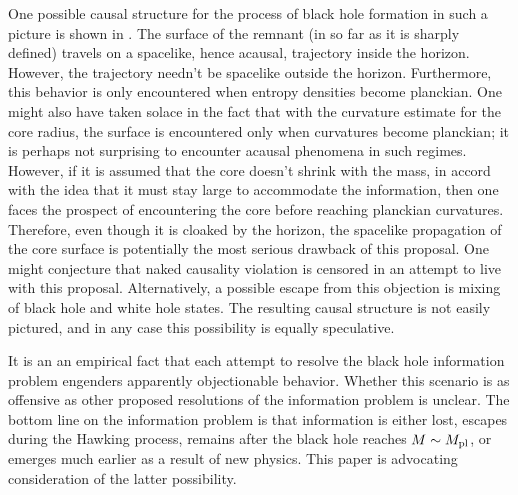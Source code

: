 One possible causal structure for the process of black hole formation in
such a picture is shown in \nfig{}\nfig{}\figs{\two,\three}.  The surface of the
remnant (in so far as it is sharply defined) travels on a spacelike, hence
acausal, trajectory inside the horizon.  However, the trajectory needn't be
spacelike outside the horizon.  Furthermore, this behavior is only
encountered when entropy densities become planckian.  One might also have
taken solace in the fact that with the curvature estimate for the core
radius,
the surface is encountered
only when curvatures become planckian; it is perhaps not surprising
to encounter acausal phenomena in such regimes.   However, if it
is assumed
that the core doesn't shrink with the mass, in accord with the idea
that it must stay large to accommodate the information, then one faces the
prospect of encountering the core before reaching planckian curvatures.
Therefore, even though it is cloaked by
the horizon, the spacelike propagation of the core surface is potentially
the most serious drawback of this proposal.  One might conjecture that
naked causality violation is censored in an attempt to live with this
proposal.
Alternatively, a possible
escape from this objection is mixing of black hole and white hole states.
The resulting causal structure is not easily pictured, and in any case this
possibility is equally speculative.

It is an an empirical fact that each attempt to  resolve the
black hole information problem engenders apparently
objectionable behavior.
Whether this scenario is as
offensive as other proposed resolutions of the
information problem
is unclear.  The bottom line on the information problem is that information
is either lost, escapes during the Hawking process, remains after the
black hole reaches $M\sim M_{\rm pl}$, or emerges much earlier as a result of new
physics.
This paper is
advocating consideration of the latter possibility.

